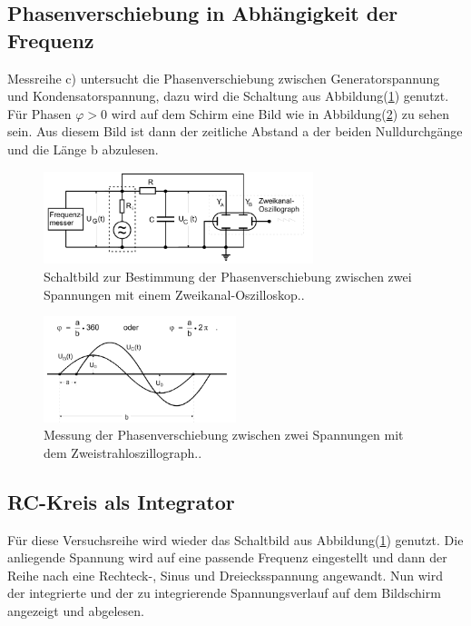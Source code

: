     \subsection{Phasenverschiebung in Abhängigkeit der Frequenz}

        \noindent Messreihe c) untersucht die Phasenverschiebung zwischen Generatorspannung und Kondensatorspannung, dazu wird die Schaltung aus 
        Abbildung(\ref{img:Phase}) genutzt. Für Phasen $\varphi > 0$ wird auf dem Schirm eine Bild wie in Abbildung(\ref{img:Zweist}) zu sehen sein.
        Aus diesem Bild ist dann der zeitliche Abstand a der beiden Nulldurchgänge und die Länge b abzulesen.

        \begin{figure}
            \centering
            \includegraphics[width=0.7\textwidth]{latex/images/Phasenverschiebung.PNG}
            \caption{Schaltbild zur Bestimmung der Phasenverschiebung zwischen zwei Spannungen mit einem Zweikanal-Oszilloskop.\protect \cite{V353}.}
            \label{img:Phase}
        \end{figure}

        \begin{figure}
            \centering
            \includegraphics[width=0.5\textwidth]{latex/images/Zweistrahloszillograph.PNG}
            \caption{Messung der Phasenverschiebung zwischen zwei Spannungen mit dem Zweistrahloszillograph.\protect \cite{V353}.}
            \label{img:Zweist}
        \end{figure}

    \subsection{RC-Kreis als Integrator}

        \noindent Für diese Versuchsreihe wird wieder das Schaltbild aus Abbildung(\ref{img:Phase}) genutzt. Die anliegende Spannung wird auf 
        eine passende Frequenz eingestellt und dann der Reihe nach eine Rechteck-, Sinus und Dreiecksspannung angewandt. Nun wird der 
        integrierte und der zu integrierende Spannungsverlauf auf dem Bildschirm angezeigt und abgelesen.



        
        
